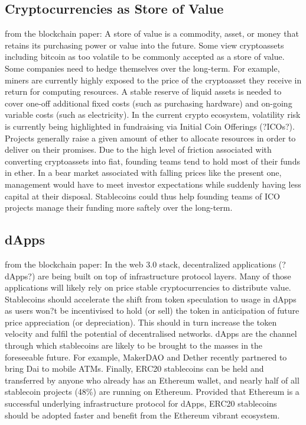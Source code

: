 \subsection{Cryptocurrencies as Store of Value}
from the blockchain paper:
A store of value is a commodity, asset, or money that retains its purchasing power or value into the future.
Some view cryptoassets including bitcoin as too volatile to be commonly accepted as a store of value.
Some companies need to hedge themselves over the long-term. For example, miners are currently highly
exposed to the price of the cryptoasset they receive in return for computing resources. A stable reserve of
liquid assets is needed to cover one-off additional fixed costs (such as purchasing hardware) and on-going
variable costs (such as electricity).
In the current crypto ecosystem, volatility risk is currently being highlighted in fundraising via Initial Coin
Offerings (?ICOs?). Projects generally raise a given amount of ether to allocate resources in order to deliver
on their promises. Due to the high level of friction associated with converting cryptoassets into fiat,
founding teams tend to hold most of their funds in ether. In a bear market associated with falling prices
like the present one, management would have to meet investor expectations while suddenly having less
capital at their disposal. Stablecoins could thus help founding teams of ICO projects manage their funding
more saftely over the long-term.

\subsection{dApps}
from the blockchain paper:
In the web 3.0 stack, decentralized applications (?dApps?) are being built on top of infrastructure protocol
layers. Many of those applications will likely rely on price stable cryptocurrencies to distribute value.
Stablecoins should accelerate the shift from token speculation to usage in dApps as users won?t be
incentivised to hold (or sell) the token in anticipation of future price appreciation (or depreciation). This
should in turn increase the token velocity and fulfil the potential of decentralised networks.
dApps are the channel through which stablecoins are likely to be brought to the masses in the foreseeable
future. For example, MakerDAO and Dether recently partnered to bring Dai to mobile ATMs.
Finally, ERC20 stablecoins can be held and transferred by anyone who already has an Ethereum wallet, and nearly half of all stablecoin projects (48\%) are running on Ethereum. Provided that Ethereum is a successful underlying infrastructure protocol for dApps, ERC20 stablecoins should be adopted faster and benefit from the Ethereum vibrant ecosystem.

